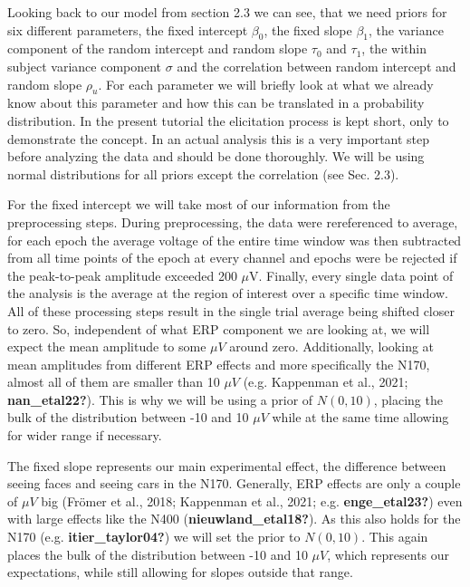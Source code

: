\documentclass[
  doc,12pt,floatsintext]{apa7}
\begin{document}
Looking back to our model from section 2.3 we can see, that we need priors for six different parameters, the fixed intercept \(\beta_0\), the fixed slope \(\beta_1\), the variance component of the random intercept and random slope \(\tau_0\) and \(\tau_1\), the within subject variance component \(\sigma\) and the correlation between random intercept and random slope \(\rho_u\). For each parameter we will briefly look at what we already know about this parameter and how this can be translated in a probability distribution. In the present tutorial the elicitation process is kept short, only to demonstrate the concept. In an actual analysis this is a very important step before analyzing the data and should be done thoroughly. We will be using normal distributions for all priors except the correlation (see Sec. 2.3).

For the fixed intercept we will take most of our information from the preprocessing steps. During preprocessing, the data were rereferenced to average, for each epoch the average voltage of the entire time window was then subtracted from all time points of the epoch at every channel and epochs were be rejected if the peak-to-peak amplitude exceeded 200 \(\mu\)V. Finally, every single data point of the analysis is the average at the region of interest over a specific time window. All of these processing steps result in the single trial average being shifted closer to zero. So, independent of what ERP component we are looking at, we will expect the mean amplitude to some \(\mu V\) around zero. Additionally, looking at mean amplitudes from different ERP effects and more specifically the N170, almost all of them are smaller than 10 \(\mu V\) (e.g. Kappenman et al., 2021; \textbf{nan\_etal22?}). This is why we will be using a prior of \(N(0, 10)\), placing the bulk of the distribution between -10 and 10 \(\mu V\) while at the same time allowing for wider range if necessary.

The fixed slope represents our main experimental effect, the difference between seeing faces and seeing cars in the N170. Generally, ERP effects are only a couple of \(\mu V\) big (Frömer et al., 2018; Kappenman et al., 2021; e.g. \textbf{enge\_etal23?}) even with large effects like the N400 (\textbf{nieuwland\_etal18?}). As this also holds for the N170 (e.g. \textbf{itier\_taylor04?}) we will set the prior to \(N(0, 10)\). This again places the bulk of the distribution between -10 and 10 \(\mu V\), which represents our expectations, while still allowing for slopes outside that range.
\end{document}
